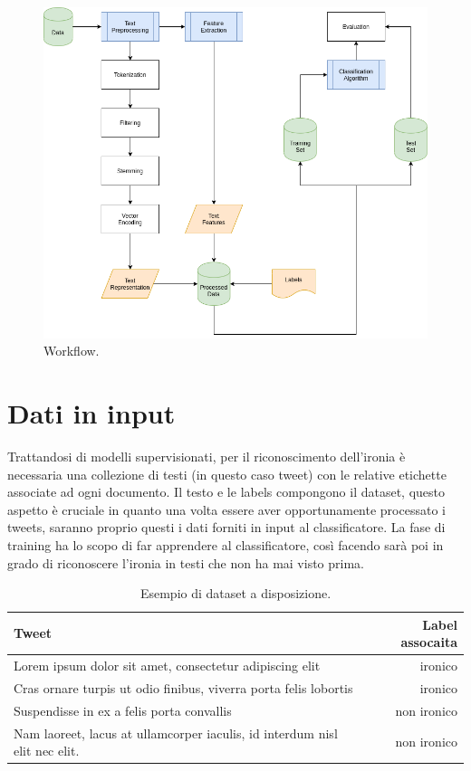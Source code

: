 \documentclass[oneside]{book}
\begin{document}
\begin{figure}
	\includegraphics[width=\linewidth]{assets/Workflow.png}
	\caption{Workflow.}
	\label{fig:workflow}
\end{figure}


\clearpage

\section{Dati in input}
Trattandosi di modelli supervisionati, per il riconoscimento dell'ironia è necessaria una collezione di testi (in questo caso tweet) con le relative etichette associate ad ogni documento. Il testo e le labels compongono il dataset, questo aspetto è cruciale in quanto una volta essere aver opportunamente processato i tweets, saranno proprio questi i dati forniti in input al classificatore. La fase di training ha lo scopo di far apprendere al classificatore, così facendo sarà poi in grado di riconoscere l'ironia in testi che non ha mai visto prima.


\begin{table}[h!]
	\centering
	\begin{tabular}[t]{lr}
		\hline
		\textbf{Tweet} & \textbf{Label assocaita}\\
		\hline
		Lorem ipsum dolor sit amet, consectetur adipiscing elit & ironico     \\
		Cras ornare turpis ut odio finibus, viverra porta felis lobortis & ironico \\
		Suspendisse in ex a felis porta convallis & non ironico \\
		Nam laoreet, lacus at ullamcorper iaculis, id interdum nisl elit nec elit. & non ironico \\
		
		\hline
	\end{tabular}
	\caption{Esempio di dataset a disposizione.}
\end{table}%
\end{document}
